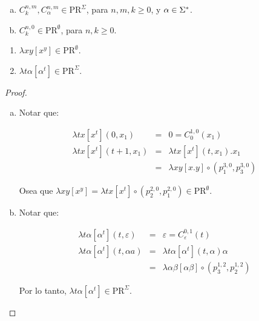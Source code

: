   \begin{lemma}
    \begin{enumerate}[a)]
      \item $C_{k}^{n,m}, C_{\alpha}^{n,m} \in \mathrm{PR}^{\Sigma}$, para $n, m, k \geq 0$, y $\alpha \in \Sigma^{\ast}$.
      \item $C_{k}^{n,0} \in \mathrm{PR}^{\emptyset}$, para $n, k \geq 0$.
    \end{enumerate}
  \end{lemma}

  \begin{lemma}
    \begin{enumerate}
      \item $\lambda xy \left[x^{y}\right] \in \mathrm{PR}^{\emptyset}$.
      \item $\lambda t\alpha \left[\alpha^{t}\right] \in \mathrm{PR}^{\Sigma}$.
    \end{enumerate}
  \end{lemma}
  \begin{proof}
    \begin{enumerate}[a)]
      \item Notar que:

        \begin{eqnarray}
          \nonumber \lambda tx \left[x^{t}\right](0, x_{1}) &=& 0 = C_{0}^{1,0}(x_{1}) \\
          \nonumber \lambda tx \left[x^{t}\right](t+1, x_{1}) &=& \lambda tx \left[x^{t}\right](t, x_{1}) . x_{1} \\
          \nonumber &=& \lambda xy \left[x.y\right] \circ (p_{1}^{3,0}, p_{3}^{3,0})
        \end{eqnarray}
        \par Osea que $\lambda xy \left[x^{y}\right] = \lambda tx \left[x^{t}\right] \circ (p_{2}^{2, 0}, p_{1}^{2, 0})
        \in \mathrm{PR}^{\emptyset}$.

      \item Notar que:

      \begin{eqnarray}
        \nonumber \lambda t\alpha \left[\alpha^{t}\right](t, \varepsilon) &=& \varepsilon = C_{\varepsilon}^{0,1}(t) \\
        \nonumber \lambda t\alpha \left[\alpha^{t}\right](t, \alpha a) &=& \lambda t\alpha \left[\alpha^{t}\right](t,
          \alpha) \alpha \\
        \nonumber &=& \lambda \alpha\beta \left[\alpha\beta \right] \circ \left(p_{3}^{1,2}, p_{2}^{1,2}\right)
      \end{eqnarray}

      \par Por lo tanto, $\lambda t\alpha \left[\alpha^{t}\right] \in \mathrm{PR}^{\Sigma}$.
    \end{enumerate}
  \end{proof}

